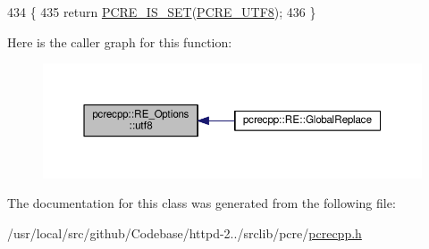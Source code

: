 \begin{DoxyCode}
434                     \{
435     \textcolor{keywordflow}{return} \hyperlink{pcrecpp_8h_a69cac2449bf14ffb7917e50d8dc61647}{PCRE\_IS\_SET}(\hyperlink{pcre_8h_a177ec66f9b06aab7b37965b77b2cf1b8}{PCRE\_UTF8});
436   \}
\end{DoxyCode}


Here is the caller graph for this function\+:
\nopagebreak
\begin{figure}[H]
\begin{center}
\leavevmode
\includegraphics[width=350pt]{classpcrecpp_1_1RE__Options_a5510afddee3c4e0ddc1d12dfdd210512_icgraph}
\end{center}
\end{figure}




The documentation for this class was generated from the following file\+:\begin{DoxyCompactItemize}
\item 
/usr/local/src/github/\+Codebase/httpd-\/2../srclib/pcre/\hyperlink{pcrecpp_8h}{pcrecpp.\+h}\end{DoxyCompactItemize}
